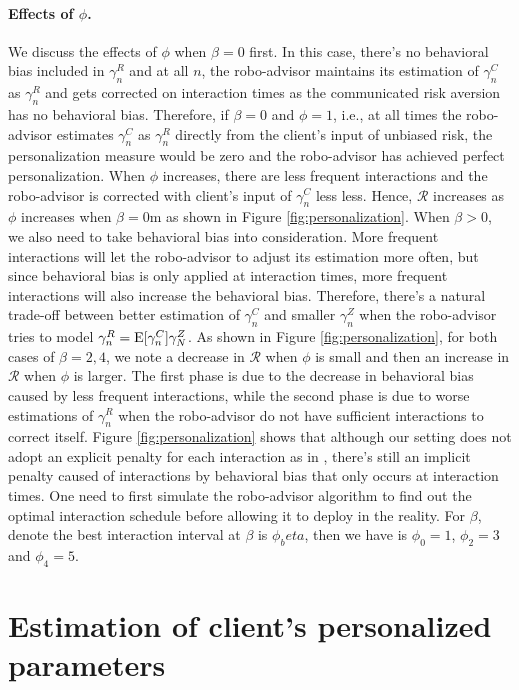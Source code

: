 \paragraph{Effects of $\phi$.} We discuss the effects of $\phi$ when $\beta=0$ first. In this case, there's no behavioral bias included in $\gamma_n^R$ and at all $n$, the robo-advisor maintains its estimation of $\gamma_n^C$ as $\gamma_n^R$ and gets corrected on interaction times as the communicated risk aversion has no behavioral bias. Therefore, if $\beta=0$ and $\phi=1$, i.e., at all times the robo-advisor estimates $\gamma_n^C$ as $\gamma_n^R$ directly from the client's input of unbiased risk, the personalization measure would be zero and the robo-advisor has achieved perfect personalization. When $\phi$ increases, there are less frequent interactions and the robo-advisor is corrected with client's input of $\gamma_n^C$ less less. Hence, $\mathcal R$ increases as $\phi$ increases when $\beta=0$m as shown in Figure \ref{fig:personalization}. When $\beta>0$, we also need to take behavioral bias into consideration. More frequent interactions will let the robo-advisor to adjust its estimation more often, but since behavioral bias is only applied at interaction times, more frequent interactions will also increase the behavioral bias. Therefore, there's a natural trade-off between better estimation of $\gamma_n^C$ and smaller $\gamma_n^Z$ when the robo-advisor tries to model $\gamma_n^R=\mathrm{E}[\gamma_n^C]\gamma_N^Z$. As shown in Figure \ref{fig:personalization}, for both cases of $\beta=2,4$, we note a decrease in $\mathcal R$ when $\phi$ is small and then an increase in $\mathcal R$ when $\phi$ is larger. The first phase is due to the decrease in behavioral bias caused by less frequent interactions, while the second phase is due to worse estimations of $\gamma_n^R$ when the robo-advisor do not have sufficient interactions to correct itself. Figure \ref{fig:personalization} shows that although our setting does not adopt an explicit penalty for each interaction as in \cite{alsabah2021robo}, there's still an implicit penalty caused of interactions by behavioral bias that only occurs at interaction times. One need to first simulate the robo-advisor algorithm to find out the optimal interaction schedule before allowing it to deploy in the reality. For $\beta$, denote the best interaction interval at $\beta$ is $\phi_beta$, then we have is $\phi_0=1$, $\phi_2=3$ and $\phi_4=5$. 

\section{Estimation of client's personalized parameters}

